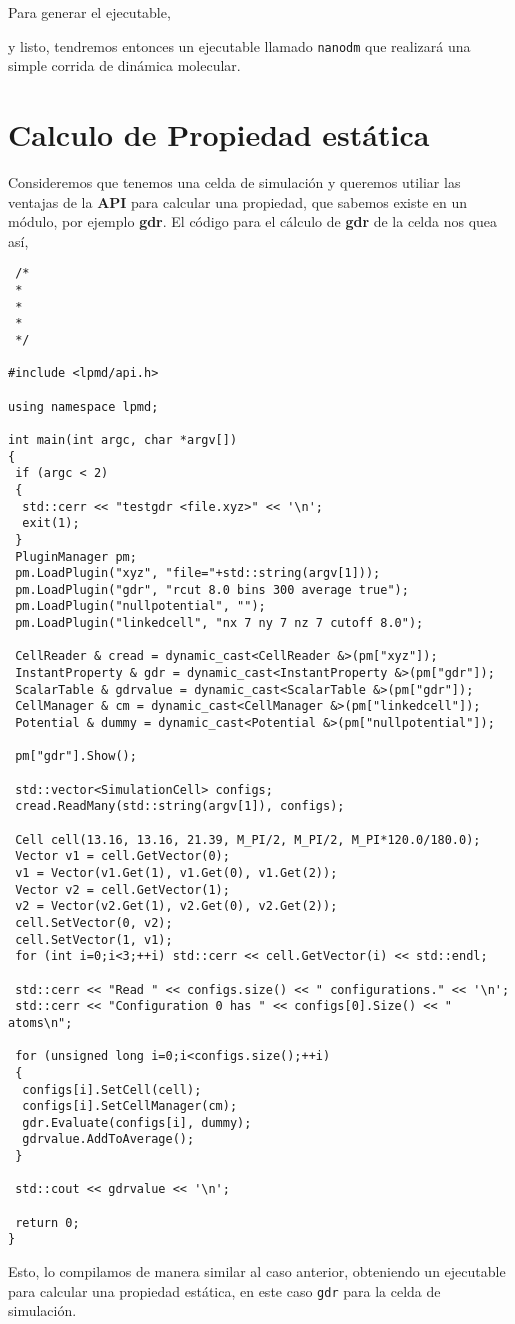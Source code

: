 Para generar el ejecutable,


y listo, tendremos entonces un ejecutable llamado \verb|nanodm| que realizar\'a una simple corrida de din\'amica molecular.

\section{Calculo de Propiedad est\'atica}

Consideremos que tenemos una celda de simulaci\'on y queremos utiliar las ventajas de la \textbf{API} para calcular una propiedad, que sabemos existe en un m\'odulo, por ejemplo \textbf{gdr}. El c\'odigo para el c\'alculo de \textbf{gdr} de la celda nos quea as\'i,

\begin{verbatim}
 /*
 *
 *
 *
 */

#include <lpmd/api.h>

using namespace lpmd;

int main(int argc, char *argv[])
{
 if (argc < 2) 
 {
  std::cerr << "testgdr <file.xyz>" << '\n';
  exit(1);
 }
 PluginManager pm;
 pm.LoadPlugin("xyz", "file="+std::string(argv[1]));
 pm.LoadPlugin("gdr", "rcut 8.0 bins 300 average true");
 pm.LoadPlugin("nullpotential", "");
 pm.LoadPlugin("linkedcell", "nx 7 ny 7 nz 7 cutoff 8.0");

 CellReader & cread = dynamic_cast<CellReader &>(pm["xyz"]);
 InstantProperty & gdr = dynamic_cast<InstantProperty &>(pm["gdr"]); 
 ScalarTable & gdrvalue = dynamic_cast<ScalarTable &>(pm["gdr"]);
 CellManager & cm = dynamic_cast<CellManager &>(pm["linkedcell"]);
 Potential & dummy = dynamic_cast<Potential &>(pm["nullpotential"]);

 pm["gdr"].Show();

 std::vector<SimulationCell> configs;
 cread.ReadMany(std::string(argv[1]), configs);

 Cell cell(13.16, 13.16, 21.39, M_PI/2, M_PI/2, M_PI*120.0/180.0);
 Vector v1 = cell.GetVector(0);
 v1 = Vector(v1.Get(1), v1.Get(0), v1.Get(2));
 Vector v2 = cell.GetVector(1);
 v2 = Vector(v2.Get(1), v2.Get(0), v2.Get(2));
 cell.SetVector(0, v2);
 cell.SetVector(1, v1);
 for (int i=0;i<3;++i) std::cerr << cell.GetVector(i) << std::endl;

 std::cerr << "Read " << configs.size() << " configurations." << '\n';
 std::cerr << "Configuration 0 has " << configs[0].Size() << " atoms\n";

 for (unsigned long i=0;i<configs.size();++i)
 {
  configs[i].SetCell(cell);
  configs[i].SetCellManager(cm);
  gdr.Evaluate(configs[i], dummy);
  gdrvalue.AddToAverage();
 }

 std::cout << gdrvalue << '\n';

 return 0;
}
\end{verbatim}

Esto, lo compilamos de manera similar al caso anterior, obteniendo un ejecutable para calcular una propiedad est\'atica, en este caso \verb|gdr| para la celda de simulaci\'on.
